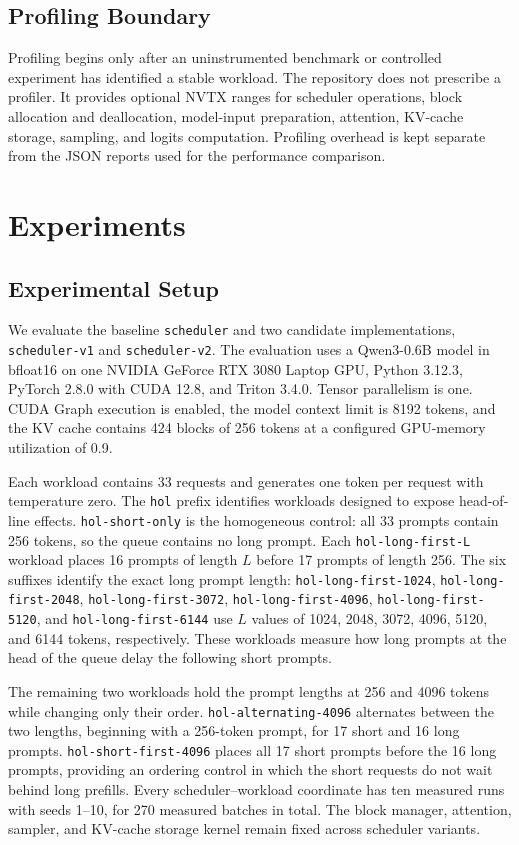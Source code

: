 \documentclass[conference]{IEEEtran}
\begin{document}
\subsection{Profiling Boundary}

Profiling begins only after an uninstrumented benchmark or controlled
experiment has identified a stable workload. The repository does not prescribe
a profiler. It provides optional NVTX ranges for scheduler operations, block
allocation and deallocation, model-input preparation, attention, KV-cache
storage, sampling, and logits computation. Profiling overhead is kept separate
from the JSON reports used for the performance comparison.

\section{Experiments}

\subsection{Experimental Setup}

We evaluate the baseline \texttt{scheduler} and two candidate implementations,
\texttt{scheduler-v1} and \texttt{scheduler-v2}. The evaluation uses a
Qwen3-0.6B model in bfloat16 on one NVIDIA GeForce RTX 3080 Laptop GPU, Python
3.12.3, PyTorch 2.8.0 with CUDA 12.8, and Triton 3.4.0. Tensor parallelism is
one. CUDA Graph execution is enabled, the model context limit is 8192 tokens,
and the KV cache contains 424 blocks of 256 tokens at a configured GPU-memory
utilization of 0.9.

Each workload contains 33 requests and generates one token per request with
temperature zero. The \texttt{hol} prefix identifies workloads designed to
expose head-of-line effects. \texttt{hol-short-only} is the homogeneous
control: all 33 prompts contain 256 tokens, so the queue contains no long
prompt. Each \texttt{hol-long-first-L} workload places 16 prompts of length
$L$ before 17 prompts of length 256. The six suffixes identify the exact long
prompt length: \texttt{hol-long-first-1024},
\texttt{hol-long-first-2048}, \texttt{hol-long-first-3072},
\texttt{hol-long-first-4096}, \texttt{hol-long-first-5120}, and
\texttt{hol-long-first-6144} use $L$ values of 1024, 2048, 3072, 4096, 5120,
and 6144 tokens, respectively. These workloads measure how long prompts at the
head of the queue delay the following short prompts.

The remaining two workloads hold the prompt lengths at 256 and 4096 tokens
while changing only their order. \texttt{hol-alternating-4096} alternates
between the two lengths, beginning with a 256-token prompt, for 17 short and
16 long prompts. \texttt{hol-short-first-4096} places all 17 short prompts
before the 16 long prompts, providing an ordering control in which the short
requests do not wait behind long prefills. Every scheduler--workload
coordinate has ten measured runs with seeds 1--10, for 270 measured batches
in total. The block manager, attention, sampler, and KV-cache storage kernel
remain fixed across scheduler variants.
\end{document}
